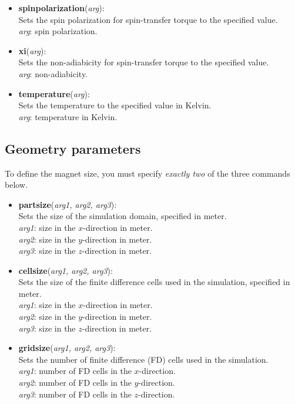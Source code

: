 \begin{itemize}
 \item \textbf{spinpolarization}(\textit{arg}):\\
				Sets the spin polarization for spin-transfer torque to the specified value.\\
				\textit{arg}: spin polarization.

 \item \textbf{xi}(\textit{arg}):\\
				Sets the non-adiabicity for spin-transfer torque to the specified value.\\
				\textit{arg}: non-adiabicity.

 \item \textbf{temperature}(\textit{arg}):\\
				Sets the temperature to the specified value in Kelvin.\\
				\textit{arg}: temperature in Kelvin.

\end{itemize}



\subsection{Geometry parameters}
To define the magnet size, you must specify \emph{exactly two} of the three commands below.\\

\begin{itemize}
 \item \textbf{partsize}(\textit{arg1, arg2, arg3}):\\
				Sets the size of the simulation domain, specified in meter.\\
				\textit{arg1}: size in the $x$-direction in meter.\\
				\textit{arg2}: size in the $y$-direction in meter.\\
				\textit{arg3}: size in the $z$-direction in meter.

 \item \textbf{cellsize}(\textit{arg1, arg2, arg3}):\\
				Sets the size of the finite difference cells used in the simulation, specified in meter.\\
				\textit{arg1}: size in the $x$-direction in meter.\\
				\textit{arg2}: size in the $y$-direction in meter.\\
				\textit{arg3}: size in the $z$-direction in meter.

 \item \textbf{gridsize}(\textit{arg1, arg2, arg3}):\\
				Sets the number of finite difference (FD) cells used in the simulation.\\
				\textit{arg1}: number of FD cells in the $x$-direction.\\
				\textit{arg2}: number of FD cells in the $y$-direction.\\
				\textit{arg3}: number of FD cells in the $z$-direction.

\end{itemize}


